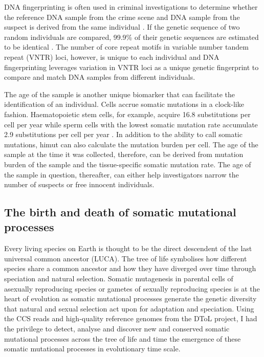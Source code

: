 DNA fingerprinting is often used in criminal investigations to determine whether the reference DNA sample from the crime scene and DNA sample from the suspect is derived from the same individual \cite{Gill1985-dt}. If the genetic sequence of two random individuals are compared, 99.9\% of their genetic sequences are estimated to be identical \cite{1000_Genomes_Project_Consortium2012-rj}. The number of core repeat motifs in variable number tandem repeat (VNTR) loci, however, is unique to each individual and DNA fingerprinting leverages variation in VNTR loci as a unique genetic fingerprint to compare and match DNA samples from different individuals. 

The age of the sample is another unique biomarker that can facilitate the identification of an individual. Cells accrue somatic mutations in a clock-like fashion. Haematopoietic stem cells, for example, acquire 16.8 substitutions per cell per year \cite{Osorio2018-mh, Mitchell2022-ry} while sperm cells with the lowest somatic mutation rate accumulate 2.9 substitutions per cell per year \cite{Rahbari2016-ot}. In addition to the ability to call somatic mutations, himut can also calculate the mutation burden per cell. The age of the sample at the time it was collected, therefore, can be derived from mutation burden of the sample and the tissue-specific somatic mutation rate. The age of the sample in question, thereafter, can either help investigators narrow the number of suspects or free innocent individuals.  

\subsection{The birth and death of somatic mutational processes}

Every living species on Earth is thought to be the direct descendent of the last universal common ancestor (LUCA). The tree of life symbolises how different species share a common ancestor and how they have diverged over time through speciation and natural selection. Somatic mutagenesis in parental cells of asexually reproducing species or gametes of sexually reproducing species is at the heart of evolution as somatic mutational processes generate the genetic diversity that natural and sexual selection act upon for adaptation and speciation. Using the CCS reads and high-quality reference genomes from the DToL project, I had the privilege to detect, analyse and discover new and conserved somatic mutational processes across the tree of life and time the emergence of these somatic mutational processes in evolutionary time scale. 

